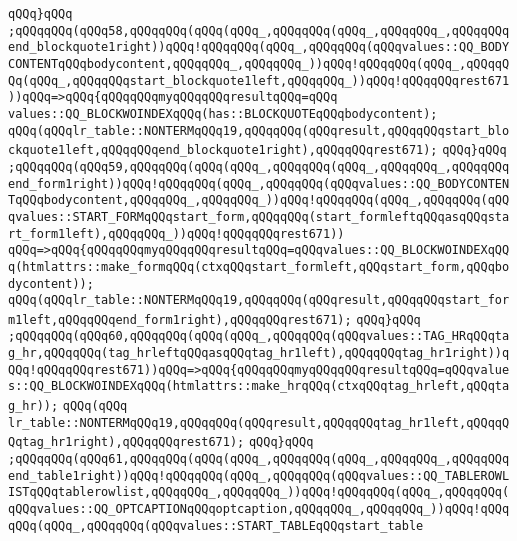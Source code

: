 \verb|qQQq}qQQq|\newline
\verb|;qQQqqQQq(qQQq58,qQQqqQQq(qQQq(qQQq_,qQQqqQQq(qQQq_,qQQqqQQq_,qQQqqQQqend_blockquote1right))qQQq!qQQqqQQq(qQQq_,qQQqqQQq(qQQqvalues::QQ_BODYCONTENTqQQqbodycontent,qQQqqQQq_,qQQqqQQq_))qQQq!qQQqqQQq(qQQq_,qQQqqQQq(qQQq_,qQQqqQQqstart_blockquote1left,qQQqqQQq_))qQQq!qQQqqQQqrest671))qQQq=>qQQq{qQQqqQQqmyqQQqqQQqresultqQQq=qQQq|\newline
\verb|values::QQ_BLOCKWOINDEXqQQq(has::BLOCKQUOTEqQQqbodycontent);|\newline
\verb|qQQq(qQQqlr_table::NONTERMqQQq19,qQQqqQQq(qQQqresult,qQQqqQQqstart_blockquote1left,qQQqqQQqend_blockquote1right),qQQqqQQqrest671);|\newline
\verb|qQQq}qQQq|\newline
\verb|;qQQqqQQq(qQQq59,qQQqqQQq(qQQq(qQQq_,qQQqqQQq(qQQq_,qQQqqQQq_,qQQqqQQqend_form1right))qQQq!qQQqqQQq(qQQq_,qQQqqQQq(qQQqvalues::QQ_BODYCONTENTqQQqbodycontent,qQQqqQQq_,qQQqqQQq_))qQQq!qQQqqQQq(qQQq_,qQQqqQQq(qQQqvalues::START_FORMqQQqstart_form,qQQqqQQq(start_formleftqQQqasqQQqstart_form1left),qQQqqQQq_))qQQq!qQQqqQQqrest671))|\newline
\verb|qQQq=>qQQq{qQQqqQQqmyqQQqqQQqresultqQQq=qQQqvalues::QQ_BLOCKWOINDEXqQQq(htmlattrs::make_formqQQq(ctxqQQqstart_formleft,qQQqstart_form,qQQqbodycontent));|\newline
\verb|qQQq(qQQqlr_table::NONTERMqQQq19,qQQqqQQq(qQQqresult,qQQqqQQqstart_form1left,qQQqqQQqend_form1right),qQQqqQQqrest671);|\newline
\verb|qQQq}qQQq|\newline
\verb|;qQQqqQQq(qQQq60,qQQqqQQq(qQQq(qQQq_,qQQqqQQq(qQQqvalues::TAG_HRqQQqtag_hr,qQQqqQQq(tag_hrleftqQQqasqQQqtag_hr1left),qQQqqQQqtag_hr1right))qQQq!qQQqqQQqrest671))qQQq=>qQQq{qQQqqQQqmyqQQqqQQqresultqQQq=qQQqvalues::QQ_BLOCKWOINDEXqQQq(htmlattrs::make_hrqQQq(ctxqQQqtag_hrleft,qQQqtag_hr));|\newline
\verb|qQQq(qQQq|\newline
\verb|lr_table::NONTERMqQQq19,qQQqqQQq(qQQqresult,qQQqqQQqtag_hr1left,qQQqqQQqtag_hr1right),qQQqqQQqrest671);|\newline
\verb|qQQq}qQQq|\newline
\verb|;qQQqqQQq(qQQq61,qQQqqQQq(qQQq(qQQq_,qQQqqQQq(qQQq_,qQQqqQQq_,qQQqqQQqend_table1right))qQQq!qQQqqQQq(qQQq_,qQQqqQQq(qQQqvalues::QQ_TABLEROWLISTqQQqtablerowlist,qQQqqQQq_,qQQqqQQq_))qQQq!qQQqqQQq(qQQq_,qQQqqQQq(qQQqvalues::QQ_OPTCAPTIONqQQqoptcaption,qQQqqQQq_,qQQqqQQq_))qQQq!qQQqqQQq(qQQq_,qQQqqQQq(qQQqvalues::START_TABLEqQQqstart_table|\newline
